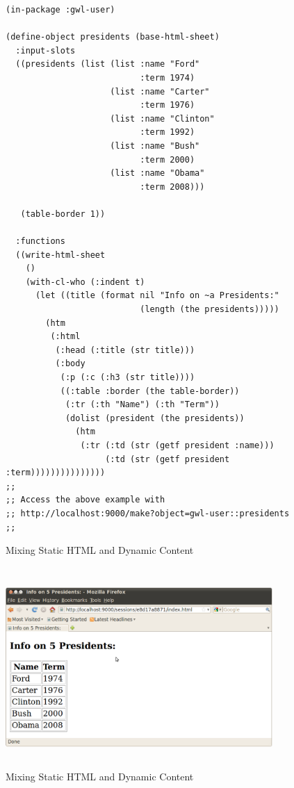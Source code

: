 \documentclass [11pt]{book}
\begin{document}
\begin{figure}
\begin{lrbox}{\boxedverb}
\begin{minipage}{\linewidth}
{\small

\begin{verbatim}(in-package :gwl-user)

(define-object presidents (base-html-sheet)
  :input-slots
  ((presidents (list (list :name "Ford"
                           :term 1974)
                     (list :name "Carter"
                           :term 1976)
                     (list :name "Clinton"
                           :term 1992)
                     (list :name "Bush"
                           :term 2000)
                     (list :name "Obama"
                           :term 2008)))
   
   (table-border 1))

  :functions
  ((write-html-sheet
    () 
    (with-cl-who (:indent t)
      (let ((title (format nil "Info on ~a Presidents:" 
                           (length (the presidents)))))
        (htm
         (:html 
          (:head (:title (str title)))
          (:body 
           (:p (:c (:h3 (str title))))
           ((:table :border (the table-border))
            (:tr (:th "Name") (:th "Term"))
            (dolist (president (the presidents))
              (htm      
               (:tr (:td (str (getf president :name)))
                    (:td (str (getf president :term)))))))))))))))
;;
;; Access the above example with 
;; http://localhost:9000/make?object=gwl-user::presidents
;;

\end{verbatim}}
\end{minipage}
\end{lrbox}
\fbox{\usebox{\boxedverb}}

\caption{Mixing Static HTML and Dynamic Content}

\label{fig:gwl-2}

\end{figure}

\begin{figure}
\begin{center}
\includegraphics[width=4in,height=3in]{../images/gwl-2.png}
\end{center}

\caption{Mixing Static HTML and Dynamic Content}

\label{fig:gwl-2-image}

\end{figure}
\end{document}
